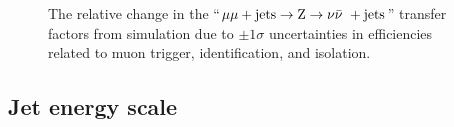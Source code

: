 \begin{figure}[!h]
{  } \\
   ~
   \\
  \caption{\label{fig:tfSyst_muonsf_mmZinv} The relative change in the
    ``$\mu\mu + \textrm{jets} \rightarrow {\text Z} \rightarrow \nu\bar{\nu}\ + \textrm{jets}$'' transfer factors from
    simulation due to $\pm1\sigma$ uncertainties in efficiencies
    related to muon trigger, identification, and isolation.  }
\end{figure}

\clearpage
\subsection{Jet energy scale}


